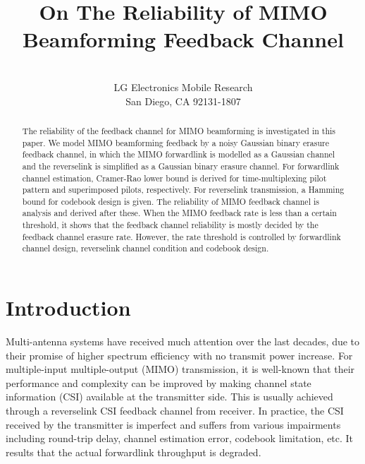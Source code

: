 \documentclass[10pt,fleqn, twocolumn]{IEEEtran}
\title{On The Reliability of MIMO Beamforming Feedback Channel}
\author{\\LG Electronics Mobile Research\\San Diego, CA 92131-1807}
\date{}
\begin{document}
\maketitle
\begin{abstract}\small
The reliability of the feedback channel for MIMO beamforming is
investigated in this paper. We model MIMO beamforming feedback by
a noisy Gaussian binary erasure feedback channel, in which the
MIMO forwardlink is modelled as a Gaussian channel and the
reverselink is simplified as a Gaussian binary erasure channel.
For forwardlink channel estimation, Cramer-Rao lower bound is
derived for time-multiplexing pilot pattern and superimposed
pilots, respectively. For reverselink transmission, a Hamming
bound for codebook design is given. The reliability of MIMO
feedback channel is analysis and derived after these. When the
MIMO feedback rate is less than a certain threshold, it shows that
the feedback channel reliability is mostly decided by the feedback
channel erasure rate. However, the rate threshold is controlled by
forwardlink channel design, reverselink channel condition and
codebook design.

\end{abstract}
\section{Introduction}
Multi-antenna systems have received much attention over the last
decades, due to their promise of higher spectrum efficiency with
no transmit power increase. For multiple-input multiple-output
(MIMO) transmission, it is well-known that their performance and
complexity can be improved by making channel state information
(CSI) available at the transmitter side. This is usually achieved
through a reverselink CSI feedback channel from receiver. In
practice, the CSI received by the transmitter is imperfect and
suffers from various impairments including round-trip delay,
channel estimation error, codebook limitation, etc. It results
that the actual forwardlink throughput is degraded.
\end{document}

